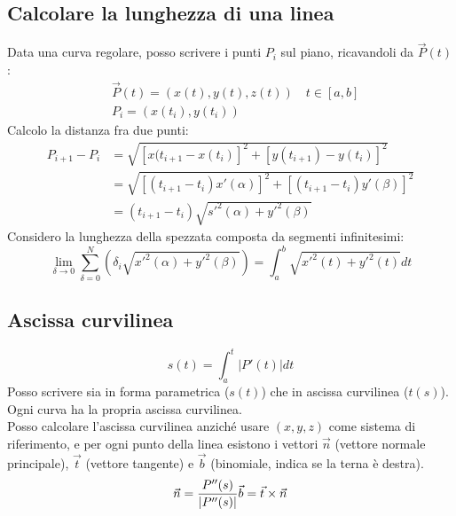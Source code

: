 \documentclass[10pt,a4paper,fleqn]{article}
\begin{document}
	\subsection{Calcolare la lunghezza di una linea}

	Data una curva regolare, posso scrivere i punti $P_i$ sul piano, ricavandoli da $\vec{P}(t)$:
	\begin{equation}
	\begin{aligned}
	&\vec{P}(t) = (x(t),y(t),z(t))\quad t \in [a,b]\\
	&P_i=(x(t_i),y(t_i))
	\end{aligned}
	\end{equation}
	Calcolo la distanza fra due punti:
	\begin{equation}
	\begin{aligned}
	P_{i+1} - P_i &= \sqrt{[x(t_{i+1}-x(t_i)]^2+[y(t_{i+1})-y(t_i)]^2}\\
	&=\sqrt{[(t_{i+1}-t_i)x'(\alpha)]^2+[(t_{i+1}-t_i)y'(\beta)]^2}\\
	&=(t_{i+1}-t_i)\sqrt{s'^2(\alpha)+y'^2(\beta)}
	\end{aligned}
	\end{equation}
	Considero la lunghezza della spezzata composta da segmenti infinitesimi:
	\begin{equation}
	\lim_{\delta\to 0}\sum^N_{\delta=0}\left( \delta_i\sqrt{x'^2(\alpha)+y'^2(\beta)} \right)=\int_a^b\sqrt{x'^2(t)+y'^2(t)}dt
	\end{equation}

	\subsection{Ascissa curvilinea}

	\begin{equation}
	s(t)=\int_a^t\left| P'(t)\right| dt
	\end{equation}
	Posso scrivere sia in forma parametrica ($s(t)$) che in ascissa curvilinea ($t(s)$).
	Ogni curva ha la propria ascissa curvilinea.\\
	Posso calcolare l'ascissa curvilinea anziché usare $(x,y,z)$ come sistema di riferimento, e per ogni punto della linea esistono i vettori $\vec{n}$ (vettore normale principale), $\vec{t}$ (vettore tangente) e $\vec{b}$ (binomiale, indica se la terna è destra).
	\begin{equation}
	\vec{n}=\frac{P''(s)}{|P''(s)|}\\ \vec{b}=\vec{t}\times\vec{n}
	\end{equation}
\end{document}
